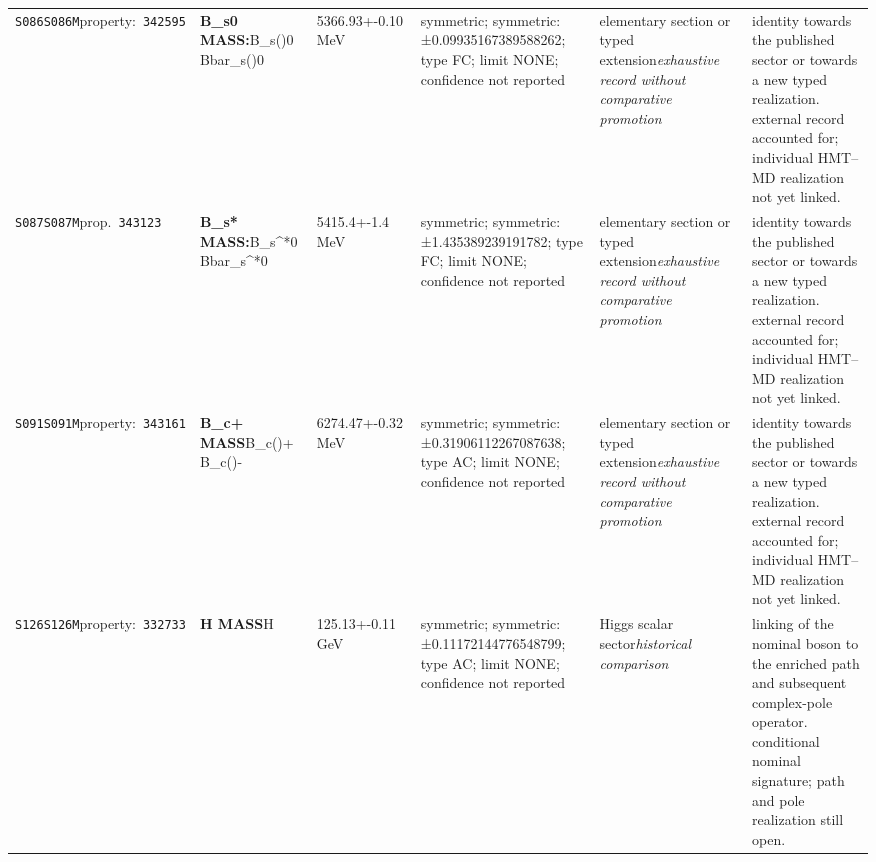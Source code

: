 \begin{landscape}
\begin{longtable}{L{1.85cm}L{4.45cm}L{2.35cm}L{4.05cm}L{3.35cm}L{7.15cm}}
\texttt{S086}\newline \texttt{S086M}\newline property:\ \texttt{342595} & \textbf{B\_\allowbreak{}s0 MASS:}\newline B\_\allowbreak{}s()0 \textbar{}\allowbreak{} Bbar\_\allowbreak{}s()0 & 5366.93+-0.10\,MeV & symmetric; symmetric: ±0.09935167389588262; type FC; limit NONE; confidence not reported & elementary section or typed extension\newline \emph{exhaustive record without comparative promotion} & identity towards the published sector or towards a new typed realization. external record accounted for; individual HMT--MD realization not yet linked. \\
\texttt{S087}\newline \texttt{S087M}\newline prop.\ \texttt{343123} & \textbf{B\_\allowbreak{}s* MASS:}\newline B\_\allowbreak{}s\textasciicircum{}*0 \textbar{}\allowbreak{} Bbar\_\allowbreak{}s\textasciicircum{}*0 & 5415.4+-1.4\,MeV & symmetric; symmetric: ±1.435389239191782; type FC; limit NONE; confidence not reported & elementary section or typed extension\newline \emph{exhaustive record without comparative promotion} & identity towards the published sector or towards a new typed realization. external record accounted for; individual HMT--MD realization not yet linked. \\
\texttt{S091}\newline \texttt{S091M}\newline property:\ \texttt{343161} & \textbf{B\_\allowbreak{}c+ MASS}\newline B\_\allowbreak{}c()+ \textbar{}\allowbreak{} B\_\allowbreak{}c()- & 6274.47+-0.32\,MeV & symmetric; symmetric: ±0.31906112267087638; type AC; limit NONE; confidence not reported & elementary section or typed extension\newline \emph{exhaustive record without comparative promotion} & identity towards the published sector or towards a new typed realization. external record accounted for; individual HMT--MD realization not yet linked. \\
\texttt{S126}\newline \texttt{S126M}\newline property:\ \texttt{332733} & \textbf{H MASS}\newline H & 125.13+-0.11\,GeV & symmetric; symmetric: ±0.11172144776548799; type AC; limit NONE; confidence not reported & Higgs scalar sector\newline \emph{historical comparison} & linking of the nominal boson to the enriched path and subsequent complex-pole operator. conditional nominal signature; path and pole realization still open. \\
\end{longtable}
\endgroup
\end{landscape}
